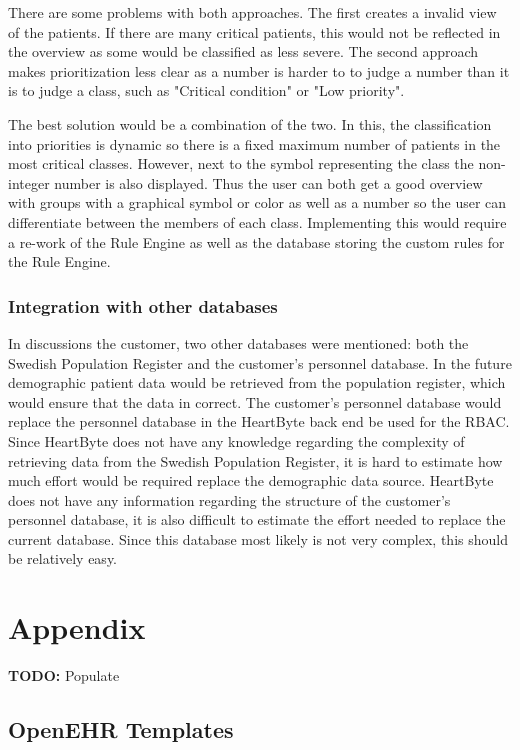 \documentclass{article}
\begin{document}
There are some problems with both approaches. The first creates a invalid view of the patients. If there are many critical patients, this would not be reflected in the overview as some would be classified as less severe. The second approach makes prioritization less clear as a number is harder to to judge a number than it is to judge a class, such as "Critical condition" or "Low priority".

The best solution would be a combination of the two. In this, the classification into priorities is dynamic so there is a fixed maximum number of patients in the most critical classes. However, next to the symbol representing the class the non-integer number is also displayed. Thus the user can both get a good overview with groups with a graphical symbol or color as well as a number so the user can differentiate between the members of each class. Implementing this would require a re-work of the Rule Engine as well as the database storing the custom rules for the Rule Engine. 

\subsubsection{Integration with other databases}
In discussions the customer, two other databases were mentioned: both the Swedish Population Register and the customer's personnel database. In the future demographic patient data would be retrieved from the population register, which would ensure that the data in correct. The customer's personnel database would replace the personnel database in the HeartByte back end be used for the RBAC.
Since HeartByte does not have any knowledge regarding the complexity of retrieving data from the Swedish Population Register, it is hard to estimate how much effort would be required replace the demographic data source. HeartByte does not have any information regarding the structure of the customer's personnel database, it is also difficult to estimate the effort needed to replace the current database. Since this database most likely is not very complex, this should be relatively easy.

\section{Appendix}
\textbf{TODO:} Populate
\subsection{OpenEHR Templates}
\end{document}
